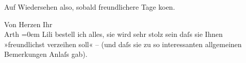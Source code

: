 \pstart
           Auf Wiedersehen also, sobald freundlichere Tage ko{\geminationm}en.\pend
           
\pstart
           Von Herzen Ihr{\\[\baselineskip]}\spacefill\mbox{Arth}\pend
           \leftskip=0em{}
\pstart
           \noindent{}Lili bestell ich alles, sie wird sehr stolz
                  sein daſs sie Ihnen »freundlichst verzeihen soll« – (und daſs sie zu so
                  interessanten allgemeinen Bemerkungen Anlaſs gab).\pend
           \endnumbering{}  \newcommand{\dateiname}{L02467}\newcommand{\titel}{Arthur Schnitzler an Hugo Hofmannsthal, 11. 3. 1926}\newcommand{\editorInnen}{Martin Anton Müller und Gerd-Hermann Susen}
